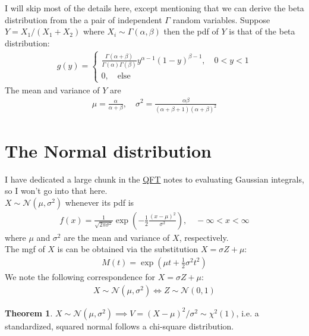 \documentclass{book}
\theoremstyle{definition}
\newtheorem{thm}{Theorem}[section]
\newcommand{\al}{\alpha}
\newcommand{\be}{\beta}
\newcommand{\f}[2]{\frac{#1}{#2}}
\newcommand{\lp}{\left(}
\newcommand{\rp}{\right)}
\begin{document}
I will skip most of the details here, except mentioning that we can derive the beta distribution from the a pair of independent $\Gamma$ random variables. Suppose $Y = X_1/(X_1 + X_2)$ where $X_i \sim \Gamma(\alpha, \beta)$ then the pdf of $Y$ is that of the beta distribution:
\begin{align}
\boxed{g(y) = \begin{cases}
	\f{\Gamma(\alpha+\beta)}{\Gamma(\alpha)\Gamma(\beta)}y^{\alpha-1}(1-y)^{\beta-1},\quad 0< y< 1\\
	0,\quad \text{else}
	\end{cases}}
\end{align} 
The mean and variance of $Y$ are
\begin{align}
\boxed{\mu = \f{\alpha}{\alpha+ \beta}, \quad \sigma^2 = \f{\alpha\beta}{(\al + \be + 1)(\al + \be)^2}}
\end{align}





\section{The Normal distribution}

I have dedicated a large chunk in the \href{https://huanqbui.com/LaTeX projects/HuanBui_QM/HuanBui_QM.pdf}{\underline{QFT}} notes to evaluating Gaussian integrals, so I won't go into that here. \\

$X \sim \mathcal{N}(\mu,\sigma^2)$ whenever its pdf is
\begin{align}
\boxed{f(x) = \f{1}{\sqrt{2\pi \sigma^2}} \exp\lp -\f{1}{2}\f{(x-\mu)^2}{\sigma^2} \rp, \quad -\infty < x < \infty}
\end{align}
where $\mu$ and $\sigma^2$ are the mean and variance of $X$, respectively. \\

The mgf of $X$ is can be obtained via the substitution $X = \sigma Z + \mu$:
\begin{align}
\boxed{M(t) = \exp\lp \mu t  + \f{1}{2}\sigma^2 t^2 \rp}
\end{align}
We note the following correspondence for $X = \sigma Z + \mu$:
\begin{align}
X \sim \mathcal{N}(\mu,\sigma^2) \iff {Z \sim \mathcal{N}(0,1)}
\end{align}

\begin{thm} $X \sim \mathcal{N}(\mu, \sigma^2) \implies V = (X-\mu)^2/\sigma^2 \sim \chi^2(1)$, i.e. a standardized, squared normal follows a chi-square distribution. 
\end{thm}
\end{document}
